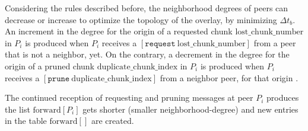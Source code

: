 Considering the rules described before, the neighborhood degrees of
peers can decrease or increase to optimize the topology of the
overlay, by minimizing $\Delta t_b$. An increment in the degree for the origin of a requested
chunk $\text{lost\_chunk\_number}$ in $P_i$ is produced when $P_i$
receives a $[\mathtt{request}~\text{lost\_chunk\_number}]$ from a peer
that is not a neighbor, yet. On the contrary, a decrement in the
degree for the origin of a pruned chunk
$\text{duplicate\_chunk\_index}$ in $P_i$ is produced when $P_i$
receives a $[\mathtt{prune}~\text{duplicate\_chunk\_index}]$ from a
neighbor peer, for that origin . 

The continued reception of requesting and pruning messages at peer $P_i$ produces the list
$\text{forward}[P_i]$ gets shorter  (smaller \gls{neighborhood-degree})
and new entries in the table $\text{forward}[]$ are created.
